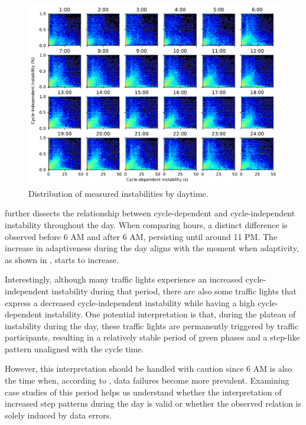 \begin{figure}[ht]
    \centering
    \includegraphics[width=\linewidth]{images/predictability-heatmap-hourly.pdf}
    \caption{Distribution of measured instabilities by daytime.}\label{fig:predictability-heatmap-hourly}
\end{figure}

 further dissects the relationship between cycle-dependent and cycle-independent instability throughout the day. When comparing hours, a distinct difference is observed before 6 AM and after 6 AM, persisting until around 11 PM. The increase in adaptiveness during the day aligns with the moment when adaptivity, as shown in , starts to increase. 

Interestingly, although many traffic lights experience an increased cycle-independent instability during that period, there are also some traffic lights that express a decreased cycle-independent instability while having a high cycle-dependent instability. One potential interpretation is that, during the plateau of instability during the day, these traffic lights are permanently triggered by traffic participants, resulting in a relatively stable period of green phases and a step-like pattern unaligned with the cycle time.

However, this interpretation should be handled with caution since 6 AM is also the time when, according to , data failures become more prevalent. Examining case studies of this period helps us understand whether the interpretation of increased step patterns during the day is valid or whether the observed relation is solely induced by data errors.


